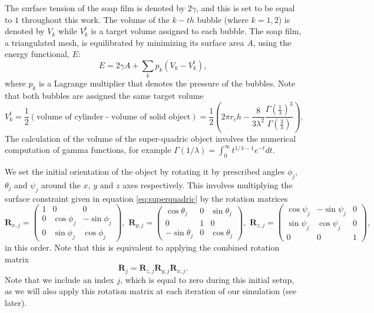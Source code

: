 \documentclass[preprint]{revtex4-1}
\begin{document}
The surface tension of the soap film is denoted by $2\gamma$, and this is set to be equal to $1$ throughout this work. The volume of the $k-th$ bubble (where $k=1,2$) is denoted by $V_k$ while $V_k^t$ is a target volume assigned to each bubble. The soap film, a triangulated mesh, is equilibrated by minimizing its surface area $A$, using the energy functional, $E$:
\begin{equation}
E=2\gamma A + \sum_{k} p_k\left(V_k-V_k^t\right),
\label{eq:energy}
\end{equation}
where $p_k$ is a Lagrange multiplier that denotes the pressure of the bubbles. Note that both bubbles are assigned the same target volume
\begin{equation}
V_k^t=\frac{1}{2}\left(\mbox{volume of cylinder - volume of solid object}\right)=\frac{1}{2}\left(2\pi r_c h-\frac{8}{3\lambda^2}\frac{\Gamma\left(\frac{1}{\lambda}\right)^3}{\Gamma\left(\frac{3}{\lambda}\right)}\right).
\end{equation}
The calculation of the volume of the super-quadric object involves the numerical computation of gamma functions, for example $\Gamma\left(1/\lambda\right)=\int_0^\infty t^{1/\lambda-1}e^{-t}dt$.   

We set the initial orientation of the object by rotating it by prescribed angles $\phi_j$, $\theta_j$ and $\psi_j$ around the $x$, $y$ and $z$ axes respectively.    This involves multiplying the surface constraint given in equation \ref{eq:superquadric} by the rotation matrices
\begin{equation}
\textbf{R}_{x,j} = \left( \begin{array}{ccc}
1 & 0 & 0 \\
0 & \cos\phi_j & -\sin\phi_j \\
0 & \sin\phi_j & \cos\phi_j \end{array} \right),\,\,
\textbf{R}_{y,j} = \left( \begin{array}{ccc}
\cos\theta_j & 0 & \sin\theta_j \\
0 & 1 & 0 \\
-\sin\theta_j & 0 & \cos\theta_j \end{array} \right),\,\,
\textbf{R}_{z,j} = \left( \begin{array}{ccc}
\cos\psi_j & -\sin\psi_j & 0 \\
\sin\psi_j & \cos\psi_j & 0 \\
0 & 0 & 1 \end{array} \right),\,\,
\label{eq:rotation_matrix}
\end{equation}
in this order. Note that this is equivalent to applying the combined rotation matrix
\begin{equation}
\textbf{R}_j = \textbf{R}_{z,j}\textbf{R}_{y,j}\textbf{R}_{x,j}.
\label{eq:rotation_matrix1} 
\end{equation}
Note that we include an index $j$, which is equal to zero during this initial setup, as we will also apply this rotation matrix at each iteration of our simulation (see later). 
\end{document}
